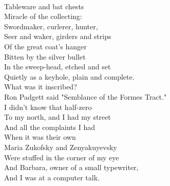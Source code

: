\documentclass[smalldemyvopaper,11pt,twoside,onecolumn,openright,extrafontsizes]{memoir}
\begin{document}
\\Tableware and bat chests
\\Miracle of the collecting:
\\Swordmaker, curlerer, hunter,
\\Seer and waker, girders and strips
\\Of the great coat's hanger
\\Bitten by the silver bullet
\\In the sweep-head, etched and set
\\Quietly as a keyhole, plain and complete.
\\What was it inscribed?
\\Ron Padgett said "Semblance of the Formes Tract."
\\I didn't know that half-zero
\\To my north, and I had my street
\\And all the complaints I had
\\When it was their own
\\Maria Zukofsky and Zenyakuyevsky
\\Were stuffed in the corner of my eye
\\And Barbara, owner of a small typewriter,
\\And I was at a computer talk.
\end{document}
